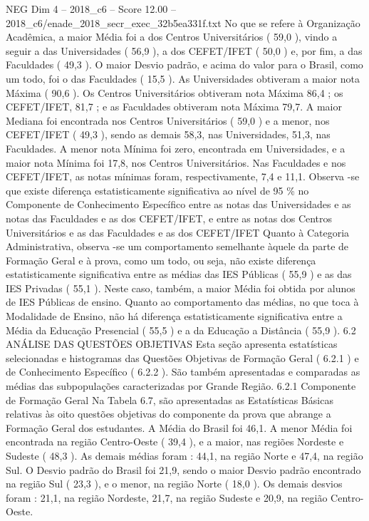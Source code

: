 \begin{textsample}{NEG Dim 4 – 2018\_c6 – Score 12.00 – 2018\_c6/enade\_2018\_secr\_exec\_32b5ea331f.txt}
No que se refere à Organização Acadêmica, a maior Média foi a dos Centros Universitários ( 59,0 ), vindo a seguir a das Universidades ( 56,9 ), a dos CEFET/IFET ( 50,0 ) e, por fim, a das Faculdades ( 49,3 ).
O maior Desvio padrão, e acima do valor para o Brasil, como um todo, foi o das Faculdades ( 15,5 ).
As Universidades obtiveram a maior nota Máxima ( 90,6 ).
Os Centros Universitários obtiveram nota Máxima 86,4 ; os CEFET/IFET, 81,7 ; e as Faculdades obtiveram nota Máxima 79,7.
A maior Mediana foi encontrada nos Centros Universitários ( 59,0 ) e a menor, nos CEFET/IFET ( 49,3 ), sendo as demais 58,3, nas Universidades, 51,3, nas Faculdades.
A menor nota Mínima foi zero, encontrada em Universidades, e a maior nota Mínima foi 17,8, nos Centros Universitários.
Nas Faculdades e nos CEFET/IFET, as notas mínimas foram, respectivamente, 7,4 e 11,1.
Observa -se que existe diferença estatisticamente significativa ao nível de 95 \% no Componente de Conhecimento Específico entre as notas das Universidades e as notas das Faculdades e as dos CEFET/IFET, e entre as notas dos Centros Universitários e as das Faculdades e as dos CEFET/IFET Quanto à Categoria Administrativa, observa -se um comportamento semelhante àquele da parte de Formação Geral e à prova, como um todo, ou seja, não existe diferença estatisticamente significativa entre as médias das IES Públicas ( 55,9 ) e as das IES Privadas ( 55,1 ).
Neste caso, também, a maior Média foi obtida por alunos de IES Públicas de ensino.
Quanto ao comportamento das médias, no que toca à Modalidade de Ensino, não há diferença estatisticamente significativa entre a Média da Educação Presencial ( 55,5 ) e a da Educação a Distância ( 55,9 ). 6.2 ANÁLISE DAS QUESTÕES OBJETIVAS Esta seção apresenta estatísticas selecionadas e histogramas das Questões Objetivas de Formação Geral ( 6.2.1 ) e de Conhecimento Específico ( 6.2.2 ).
São também apresentadas e comparadas as médias das subpopulações caracterizadas por Grande Região. 6.2.1 Componente de Formação Geral Na Tabela 6.7, são apresentadas as Estatísticas Básicas relativas às oito questões objetivas do componente da prova que abrange a Formação Geral dos estudantes.
A Média do Brasil foi 46,1.
A menor Média foi encontrada na região Centro-Oeste ( 39,4 ), e a maior, nas regiões Nordeste e Sudeste ( 48,3 ).
As demais médias foram : 44,1, na região Norte e 47,4, na região Sul.
O Desvio padrão do Brasil foi 21,9, sendo o maior Desvio padrão encontrado na região Sul ( 23,3 ), e o menor, na região Norte ( 18,0 ).
Os demais desvios foram : 21,1, na região Nordeste, 21,7, na região Sudeste e 20,9, na região Centro-Oeste.

\end{textsample}
